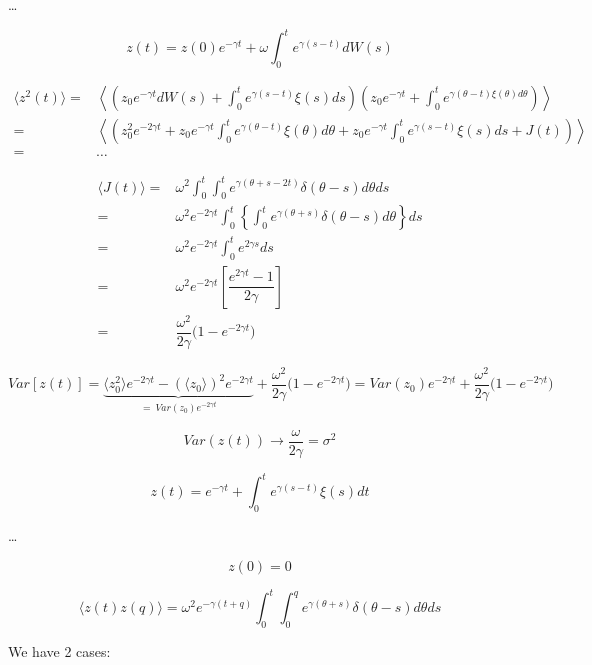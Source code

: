 \dots

$$
z(t) = z(0)e^{- \gamma t} + \omega \int_0^t e^{\gamma (s-t)} dW(s)
$$

$$
\begin{array}{rl}
\langle z^2(t) \rangle =& 
\left\langle 
    \left(
        z_0 e^{-\gamma t} dW(s) + \int_0^t e^{\gamma(s - t)} \xi(s)ds
    \right)
    \left(
        z_0 e^{-\gamma t} + \int_0^t e^{\gamma(\theta - t) \xi(\theta)d\theta}
    \right)
\right\rangle
\\
=&
\left\langle
    \left(
        z_0 ^2 e^{-2\gamma t} + z_0 e^{-\gamma t} \int_0^t e^{\gamma(\theta - t)} \xi(\theta)d\theta + z_0 e^{-\gamma t} \int_0^t e^{\gamma(s - t)} \xi(s)ds + J(t)
    \right)
\right\rangle
\\
=&
\dots
\end{array}
$$

$$
\begin{array}{rl}
    \langle J(t) \rangle =& \omega^2 \int_0^t \int_0^t e^{\gamma(\theta + s - 2t)} \delta(\theta - s) d\theta ds\\
    =&
    \omega^2 e^{-2\gamma t} \int_0^t
     \left\{
        \int_0^t e^{\gamma(\theta + s)} \delta(\theta - s) d\theta 
    \right\}
    ds\\
    =&
    \omega^2 e^{-2\gamma t} \int_0^t e^{2 \gamma s} ds \\
    =&
    \omega^2 e^{-2\gamma t} \left[\dfrac{e^{2 \gamma t} - 1}{2 \gamma}\right] \\
    =&
    \dfrac{\omega^2}{2 \gamma} \big(1 - e^{-2 \gamma t}\big)
\end{array}
$$

$$
Var[z(t)] = \underbrace{\langle z_0^2 \rangle e^{-2 \gamma t} - (\langle z_0 \rangle)^2 e^{-2 \gamma t}}_{= \ Var(z_0)e^{-2 \gamma t}} + \dfrac{\omega^2}{2 \gamma} \big(1 - e^{-2 \gamma t}\big) = Var(z_0) e^{-2 \gamma t} + \dfrac{\omega^2}{2 \gamma} \big(1 - e^{-2 \gamma t}\big)
$$

$$
Var(z(t)) \to \dfrac {\omega}{2 \gamma} = \sigma^2
$$

$$
z(t) = e^{-\gamma t} + \int _0^t e^{\gamma(s-t)} \xi(s)dt
$$

\dots

$$z(0) = 0$$

$$
\langle z(t) z(q) \rangle = \omega^2 e^{-\gamma (t + q)} \int_0^t \int_0^q e^{\gamma(\theta + s)} \delta(\theta - s) d\theta ds
$$

We have 2 cases:


